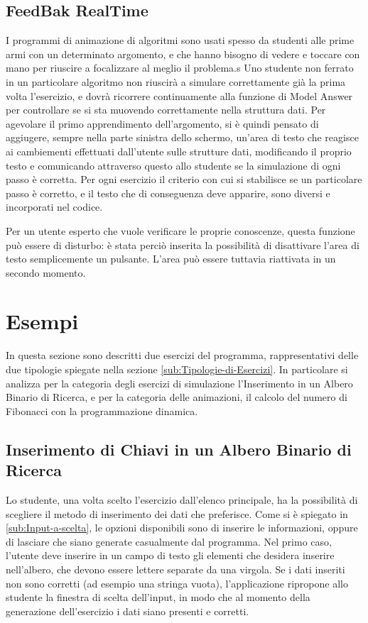 \subsection{FeedBak RealTime}

I programmi di animazione di algoritmi sono usati spesso da studenti
alle prime armi con un determinato argomento, e che hanno bisogno
di vedere e toccare con mano per riuscire a focalizzare al meglio
il problema.s Uno studente non ferrato in un particolare algoritmo
non riuscirà a simulare correttamente già la prima volta l'esercizio,
e dovrà ricorrere continuamente alla funzione di Model Answer per
controllare se si sta muovendo correttamente nella struttura dati.
Per agevolare il primo apprendimento dell'argomento, si è quindi pensato
di aggiugere, sempre nella parte sinistra dello schermo, un'area di
testo che reagisce ai cambiementi effettuati dall'utente sulle strutture
dati, modificando il proprio testo e comunicando attraverso questo
allo studente se la simulazione di ogni passo è corretta. Per ogni
esercizio il criterio con cui si stabilisce se un particolare passo
è corretto, e il testo che di conseguenza deve apparire, sono diversi
e incorporati nel codice.

Per un utente esperto che vuole verificare le proprie conoscenze,
questa funzione può essere di disturbo: è stata perciò inserita la
possibilità di disattivare l'area di testo semplicemente un pulsante.
L'area può essere tuttavia riattivata in un secondo momento.


\section{\label{sec:Esempi}Esempi}

In questa sezione sono descritti due esercizi del programma, rappresentativi
delle due tipologie spiegate nella sezione \ref{sub:Tipologie-di-Esercizi}.
In particolare si analizza per la categoria degli esercizi di simulazione
l'Inserimento in un Albero Binario di Ricerca, e per la categoria
delle animazioni, il calcolo del numero di Fibonacci con la programmazione
dinamica.


\subsection{\label{sub:Inserimento-di-Chiavi}Inserimento di Chiavi in un Albero
Binario di Ricerca}

Lo studente, una volta scelto l'esercizio dall'elenco principale,
ha la possibilità di scegliere il metodo di inserimento dei dati che
preferisce. Come si è spiegato in \ref{sub:Input-a-scelta}, le opzioni
disponibili sono di inserire le informazioni, oppure di lasciare che
siano generate casualmente dal programma. Nel primo caso, l'utente
deve inserire in un campo di testo gli elementi che desidera inserire
nell'albero, che devono essere lettere separate da una virgola. Se
i dati inseriti non sono corretti (ad esempio una stringa vuota),
l'applicazione ripropone allo studente la finestra di scelta dell'input,
in modo che al momento della generazione dell'esercizio i dati siano
presenti e corretti.

